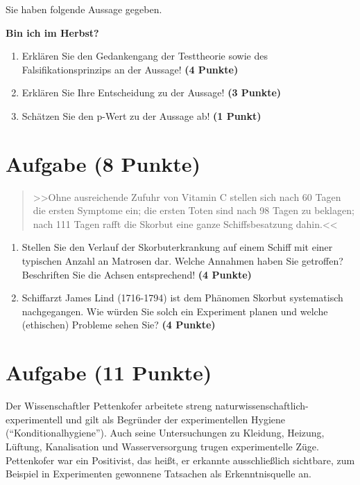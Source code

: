 \documentclass[a4paper, 10pt]{scrartcl}\usepackage[]{graphicx}\usepackage[]{color}
\begin{document}
Sie haben folgende Aussage gegeben.

\begin{center}
  \Large\textbf{Bin ich im Herbst?}
\end{center}

\begin{enumerate}
\item Erkl{\"a}ren Sie den Gedankengang der Testtheorie sowie des Falsifikationsprinzips an der Aussage! \textbf{(4 Punkte)}
\item Erkl{\"a}ren Sie Ihre Entscheidung zu der Aussage! \textbf{(3 Punkte)}
\item Sch{\"a}tzen Sie den p-Wert zu der Aussage ab! \textbf{(1 Punkt)}
\end{enumerate}

 
\clearpage

\section{Aufgabe \hfill (8 Punkte)}



\begin{quote}
  >>Ohne ausreichende Zufuhr von Vitamin C stellen sich nach 60 Tagen die
  ersten Symptome ein; die ersten Toten sind nach 98 Tagen zu beklagen;
  nach 111 Tagen rafft die Skorbut eine ganze Schiffsbesatzung dahin.<<
\end{quote}


\begin{enumerate}
\item Stellen Sie den Verlauf der Skorbuterkrankung auf einem Schiff mit
  einer typischen Anzahl an Matrosen dar. Welche Annahmen haben
  Sie getroffen? Beschriften Sie die Achsen entsprechend!
  \textbf{(4 Punkte)}
\item Schiffarzt James Lind (1716-1794) ist dem Ph{\"a}nomen Skorbut
  systematisch nachgegangen. Wie w{\"u}rden Sie solch ein Experiment planen und
  welche (ethischen) Probleme sehen Sie? \textbf{(4 Punkte)}
\end{enumerate} 
\clearpage

\section{Aufgabe \hfill (11 Punkte)}

Der Wissenschaftler Pettenkofer arbeitete streng naturwissenschaftlich-experimentell und gilt
als Begr{\"u}nder der experimentellen Hygiene (``Konditionalhygiene''). Auch
seine Untersuchungen zu Kleidung, Heizung, L{\"u}ftung, Kanalisation und
Wasserversorgung trugen experimentelle Z{\"u}ge. Pettenkofer war ein Positivist, das hei{\ss}t, er erkannte ausschlie{\ss}lich
sichtbare, zum Beispiel in Experimenten gewonnene Tatsachen als
Erkenntnisquelle an.
\end{document}
